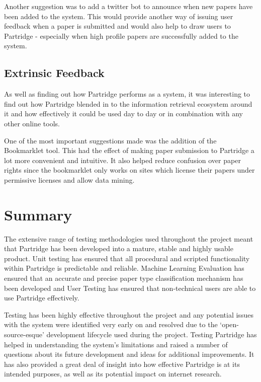 Another suggestion was to add a twitter bot to announce when new papers have
been added to the system. This would provide another way of issuing user
feedback when a paper is submitted and would also help to draw users to
Partridge - especially when high profile papers are successfully added to the
system.

\subsection{Extrinsic Feedback}

As well as finding out how Partridge performs as a system, it was interesting
to find out how Partridge blended in to the information retrieval ecosystem around
it and how effectively it could be used day to day or in combination with any other
online tools.

One of the most important suggestions made was the addition of the Bookmarklet
tool. This had the effect of making paper submission to Partridge a lot more
convenient and intuitive. It also helped reduce confusion over paper
rights since the bookmarklet only works on sites which license
their papers under permissive licenses and allow data mining. 

\section{Summary}

The extensive range of testing methodologies used throughout the project meant
that Partridge has been developed into a mature, stable and highly usable
product. Unit testing has ensured that all procedural and scripted
functionality within Partridge is predictable and reliable. Machine Learning
Evaluation has ensured that an accurate and precise paper type classification
mechanism has been developed and User Testing has ensured that non-technical
users are able to use Partridge effectively.

Testing has been highly effective throughout the project and any potential
issues with the system were identified very early on and resolved due to the
`open-source-esque' development lifecycle used during the project.  Testing
Partridge has helped in understanding the system's limitations and raised a
number of questions about its future development and ideas for additional
improvements. It has also provided a great deal of insight into how effective
Partridge is at its intended purposes, as well as its potential impact on
internet research.
